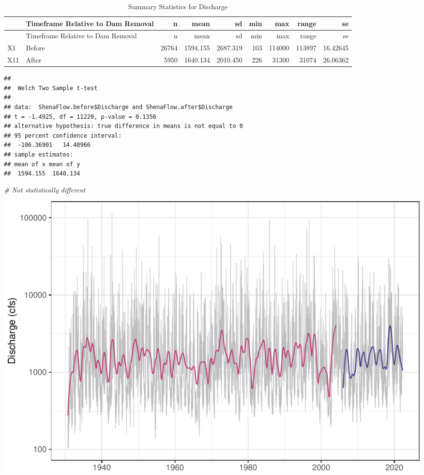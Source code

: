 \documentclass[
  12pt,
]{article}
\newenvironment{Shaded}{\begin{snugshade}}{\end{snugshade}}
\newcommand{\AttributeTok}[1]{\textcolor[rgb]{0.77,0.63,0.00}{#1}}
\newcommand{\CommentTok}[1]{\textcolor[rgb]{0.56,0.35,0.01}{\textit{#1}}}
\newcommand{\ConstantTok}[1]{\textcolor[rgb]{0.00,0.00,0.00}{#1}}
\newcommand{\FunctionTok}[1]{\textcolor[rgb]{0.00,0.00,0.00}{#1}}
\newcommand{\NormalTok}[1]{#1}
\newcommand{\OtherTok}[1]{\textcolor[rgb]{0.56,0.35,0.01}{#1}}
\newcommand{\SpecialCharTok}[1]{\textcolor[rgb]{0.00,0.00,0.00}{#1}}
\begin{document}
\begin{longtable}[]{@{}llrrrrrrr@{}}
\caption{Summary Statistics for Discharge}\tabularnewline
\toprule
& Timeframe Relative to Dam Removal & n & mean & sd & min & max & range
& se \\
\midrule
\endfirsthead
\toprule
& Timeframe Relative to Dam Removal & n & mean & sd & min & max & range
& se \\
\midrule
\endhead
X1 & Before & 26764 & 1594.155 & 2687.319 & 103 & 114000 & 113897 &
16.42645 \\
X11 & After & 5950 & 1640.134 & 2010.450 & 226 & 31300 & 31074 &
26.06362 \\
\bottomrule
\end{longtable}

\begin{Shaded}
\end{Shaded}

\begin{verbatim}
## 
##  Welch Two Sample t-test
## 
## data:  ShenaFlow.before$Discharge and ShenaFlow.after$Discharge
## t = -1.4925, df = 11220, p-value = 0.1356
## alternative hypothesis: true difference in means is not equal to 0
## 95 percent confidence interval:
##  -106.36901   14.40966
## sample estimates:
## mean of x mean of y 
##  1594.155  1640.134
\end{verbatim}

\begin{Shaded}
\begin{Highlighting}[]
\CommentTok{\# Not statistically different}
\end{Highlighting}
\end{Shaded}

\includegraphics{Project_Template_files/figure-latex/flow_ts_graph-1.pdf}
\end{document}
